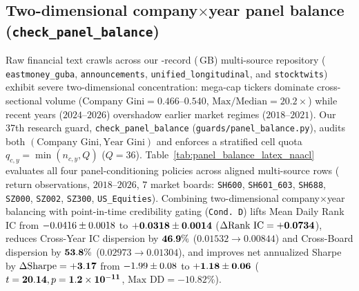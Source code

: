 \subsection{Two-dimensional \texorpdfstring{company$\times$year}{company x year} panel balance (\texttt{check\_panel\_balance})}
Raw financial text crawls across our \CorpusTotalRecords{}-record (\CorpusTotalSizeGB{}\,GB) multi-source
repository (\CorpusGubaRecords{} \texttt{eastmoney\_guba}, \CorpusAnnounceRecords{} \texttt{announcements},
\CorpusXueqiuRecords{} \texttt{unified\_longitudinal}, and \CorpusStockTwitsRecords{} \texttt{stocktwits})
exhibit severe two-dimensional concentration: mega-cap tickers dominate cross-sectional volume
($\text{Company Gini} = 0.466\text{--}0.540$, $\text{Max/Median} = 20.2\times$) while recent years
($2024\text{--}2026$) overshadow earlier market regimes ($2018\text{--}2021$). Our 37th research guard,
\texttt{check\_panel\_balance} (\texttt{guards/panel\_balance.py}), audits both
$(\text{Company Gini}, \text{Year Gini})$ and enforces a stratified cell quota $q_{c,y} = \min(n_{c,y}, Q)$
($Q=36$). Table~\ref{tab:panel_balance_latex_naacl} evaluates all four panel-conditioning policies across
\PanelBalancedRows{} aligned multi-source rows (\PanelEvalReturnObs{} return observations, $2018\text{--}2026$,
$7$ market boards: \texttt{SH600}, \texttt{SH601\_603}, \texttt{SH688}, \texttt{SZ000}, \texttt{SZ002},
\texttt{SZ300}, \texttt{US\_Equities}). Combining two-dimensional company$\times$year balancing with
point-in-time credibility gating (\texttt{Cond.\ D}) lifts Mean Daily Rank IC from
$-0.0416{} \pm 0.0018$ to $\mathbf{+0.0318{} \pm 0.0014}$
($\Delta\text{Rank IC} = \mathbf{+0.0734{}}$), reduces Cross-Year IC dispersion by
$\mathbf{46.9{}\%}$ ($0.01532 \to 0.00844$) and Cross-Board dispersion by
$\mathbf{53.8{}\%}$ ($0.02973 \to 0.01304$), and improves net annualized Sharpe by
$\Delta\text{Sharpe} = \mathbf{+3.17{}}$ from $-1.99{} \pm 0.08$ to
$\mathbf{+1.18{} \pm 0.06}$ ($t = \mathbf{20.14{}}, p = \mathbf{1.2\times 10^{-11}{}}$,
$\text{Max DD} = -10.82\%$).

